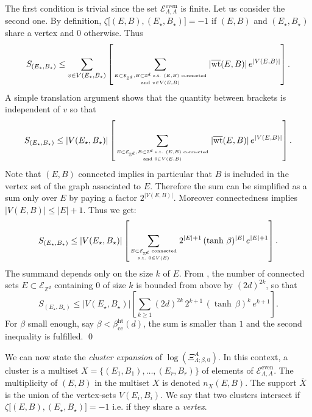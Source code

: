 \documentclass{amsart}
\newcommand{\field}[1]{\mathbb{#1}}
\newcommand{\Z}{\field{Z}}
\DeclareMathOperator\wt{wt}
\def\EEE{\mathcal{E}}
\numberwithin{equation}{section}
\theoremstyle{remark}
\renewenvironment{proof}[1][Proof]{\begin{trivlist}
\item[\hskip \labelsep {\bfseries #1:}]}{\qed\end{trivlist}}
\begin{document}
\begin{proof}
The first condition is trivial since the set $\mathcal{E}^\text{even}_{\Lambda,A}$ is finite.
Let us consider the second one.
By definition, $\zeta\big[(E,B),(E_\star,B_\star)\big]=-1$
if $(E,B)$ and $(E_\star,B_\star)$ share a vertex and $0$ otherwise.
Thus 
\[S_{(E_\star,B_\star)} \le \sum_{v \in V(E_\star,B_\star)} \left[\sum_{E \subset \EEE_{\Z^d} , B \subset \Z^d \text{ s.t. } (E,B) \text{ connected}
\atop \text{and } v \in V(E,B)}
|\overline{\wt}(E,B)|\, e^{|V(E,B)|}\right]. \]
A simple translation argument shows that the quantity between brackets is independent of $v$ so that
\[S_{(E_\star,B_\star)} \le  |V(E_\star,B_\star)| 
\left[\sum_{E \subset \EEE_{\Z^d}, B \subset \Z^d \text{ s.t. } (E,B) \text{ connected}
\atop \text{and } 0 \in V(E,B)}
|\overline{\wt}(E,B)|\, e^{|V(E,B)|}\right]. \]
Note that $(E,B)$ connected implies in particular that $B$ is included in the vertex set of the graph associated to $E$.
Therefore the sum can be simplified as a sum only over $E$ by paying a factor $2^{|V(E,B)|}$.
Moreover connectedness implies $|V(E,B)| \le |E|+1$.
Thus we get:
\[S_{(E_\star,B_\star)} \le  |V(E_\star,B_\star)| \left[\sum_{E \subset \EEE_{\Z^d} \text{ connected} \atop \text{s.t. } 0 \in V(E)}
2^{|E|+1} \, (\tanh\, \beta)^{|E|} \, e^{|E|+1} \right].\]
The summand depends only on the size $k$ of $E$.
From \cite[Lemma 3.59]{Velenik}, the number of connected sets $E \subset \EEE_{\Z^d}$ containing $0$
of size $k$ is bounded from above by $(2d)^{2k}$, so that
\[S_{(E_\star,B_\star)} \le |V(E_\star,B_\star)|  \left[ \sum_{k \ge 1} (2d)^{2k} \, 2^{k+1} \, (\tanh\, \beta)^{k}\, e^{k+1} \right].\]
For $\beta$ small enough, say $\beta < \beta^{\text{ht}}_{\text{ce}}(d)$, the sum is smaller than $1$ and the second inequality is fulfilled.
\end{proof}
We can now state the {\em cluster expansion} of $\log(\Xi^A_{\Lambda;\beta,0})$.
In this context, a cluster is a multiset \hbox{$X=\{(E_1,B_1),\dots,(E_r,B_r)\}$} of elements of $\mathcal{E}^{\text{even}}_{\Lambda,A}$.
The multiplicity of $(E,B)$ in the multiset $X$ is denoted $n_X(E,B)$.
The support $\overline{X}$ is the union of the vertex-sets $V(E_i,B_i)$.
We say that two clusters intersect if $\zeta\big[(E,B),(E_\star,B_\star)\big]=-1$ 
i.e. if they share a {\em vertex}.
\end{document}
